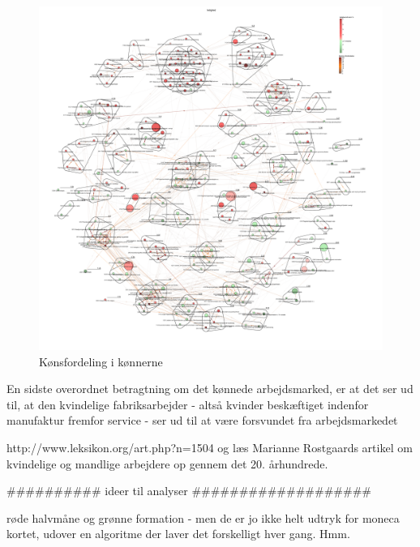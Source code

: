 %
\begin{figure}[H]
\begin{center}
  \caption{Kønsfordeling i kønnerne}
  \label{fig_delanalyse1_kort_ledighed}
  \includegraphics[width=1.0\textwidth]{fig/netvaerkskort/kort_ledighed.pdf}
\end{center}
\end{figure}
\restoregeometry
%




\iffalse
\label{iffalse}


En sidste overordnet betragtning om det kønnede arbejdsmarked, er at det ser ud til, at den kvindelige fabriksarbejder - altså kvinder beskæftiget indenfor manufaktur fremfor service - ser ud til at være forsvundet fra arbejdsmarkedet %

http://www.leksikon.org/art.php?n=1504
og læs Marianne Rostgaards artikel om kvindelige og mandlige arbejdere op gennem det 20. århundrede.




########## ideer til analyser ###################

røde halvmåne og grønne formation - men de er jo ikke helt udtryk for moneca kortet, udover en algoritme der laver det forskelligt hver gang. Hmm. 

